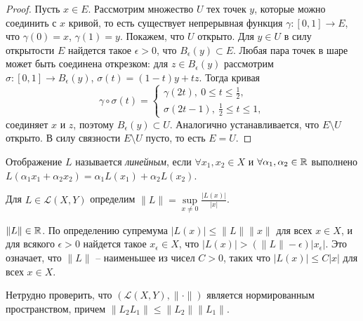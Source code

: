 \begin{proof}
    Пусть $x \in E$. Рассмотрим множество $U$ тех точек $y$, которые можно соединить с $x$ кривой, то есть существует непрерывная функция $\gamma: [0, 1] \to E$, что $\gamma(0) = x$, $\gamma(1) = y$. Покажем, что $U$ открыто. Для $y \in U$ в силу открытости $E$ найдется такое $\epsilon > 0$, что $B_{\epsilon}(y) \subset E$. Любая пара точек в шаре может быть соединена открезком: для $z \in B_{\epsilon}(y)$ рассмотрим $\sigma: [0, 1] \to B_{\epsilon}(y)$, $\sigma(t) = (1 - t)y + tz$. Тогда кривая
    \[\gamma \circ \sigma(t) = \begin{cases}
        \gamma(2t), \ 0 \leq t \leq \frac{1}{2}, \\
        \sigma(2t - 1), \ \frac{1}{2} \leq t \leq 1,
    \end{cases}\]
    соединяет $x$ и $z$, поэтому $B_{\epsilon}(y) \subset U$. Аналогично устанавливается, что $E \setminus U$ открыто. В силу связности $E \setminus U$ пусто, то есть $E = U$.
\end{proof}

\begin{definition}
    Отображение $L$ называется \textit{линейным}, если $\forall x_{1}, x_{2} \in X$ и $\forall \alpha_{1}, \alpha_{2} \in \mathbb{R}$ выполнено $L(\alpha_{1}x_{1} + \alpha_{2}x_{2}) = \alpha_{1}L(x_{1}) + \alpha_{2}L(x_{2})$.
\end{definition}

\begin{definition}
    Для $L \in \mathcal{L}(X, Y)$ определим $\|L\| = \underset{x \neq 0}{\sup}\frac{|L(x)|}{|x|}$.
\end{definition}

\begin{note}
    $\|L\| \in \mathbb{R}$. По определению супремума $|L(x)| \leq \|L\|\|x\|$ для всех $x \in X$, и для всякого $\epsilon > 0$ найдется такое $x_{\epsilon} \in X$, что $|L(x)| > (\|L\| - \epsilon)|x_{\epsilon}|$. Это означает, что $\|L\|$ -- наименьшее из чисел $C > 0$, таких что $|L(x)| \leq C|x|$ для всех $x \in X$.

    Нетрудно проверить, что $(\mathcal{L}(X, Y), \|\cdot\|)$ является нормированным пространством, причем $\|L_{2}L_{1}\| \leq \|L_{2}\|\|L_{1}\|$.
\end{note}
